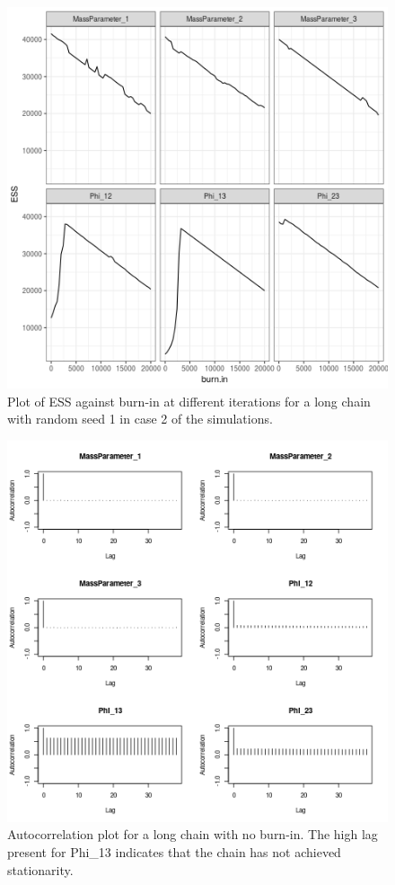 \documentclass[14pt]{extarticle} %
\begin{document}
	
	\begin{figure}[!htb]
		\centering
		\includegraphics[scale=0.65]{Images/Gen_data/Case_2/Esimated_burn_in_plot_1.png}
		\caption{Plot of ESS against burn-in at different iterations for a long chain with random seed 1 in case 2 of the simulations.}
		\label{fig:gen_data_case_2_estimated_burn_in_plot_1}
	\end{figure}
	
	\begin{figure}[!htb]
		\centering
		\includegraphics[scale=0.65]{Images/Gen_data/Case_2/Auto_correlation_plot_9.png}
		\caption{Autocorrelation plot for a long chain with no burn-in. The high lag present for Phi\_13 indicates that the chain has not achieved stationarity.}
		\label{fig:gen_data_case_2_bad_autocorrelation_plot_burn_20000_9}
	\end{figure}
	
\end{document}
